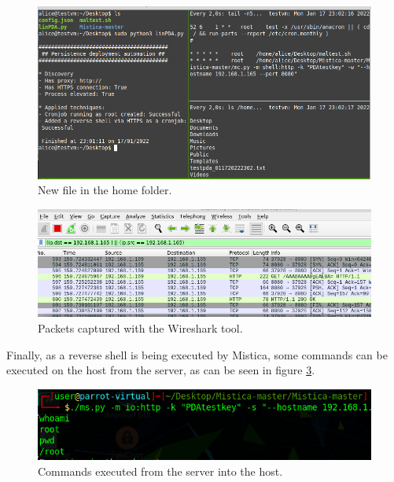 \begin{figure}[!htb]
	\centering
	\includegraphics[width=14cm]{img/newlinPDA-executionOK-post}
	\caption{New file in the home folder.}
	\label{img:newlinPDAexeOKpost}
\end{figure}


\begin{figure}[!htb]
	\centering
	\includegraphics[width=14cm]{img/newlinPDA-wiresharkcapture}
	\caption{Packets captured with the Wireshark tool.}
	\label{img:newlinPDAwireshark}
\end{figure}

\pagebreak
Finally, as a reverse shell is being executed by Mistica, some commands can be executed on the host from the server, as can be seen in figure \ref{img:newlinPDAserverreverseshell}.

\begin{figure}[!htb]
	\centering
	\includegraphics[width=14cm]{img/newlinPDA-serversuccess}
	\caption{Commands executed from the server into the host.}
	\label{img:newlinPDAserverreverseshell}
\end{figure}

\pagebreak


